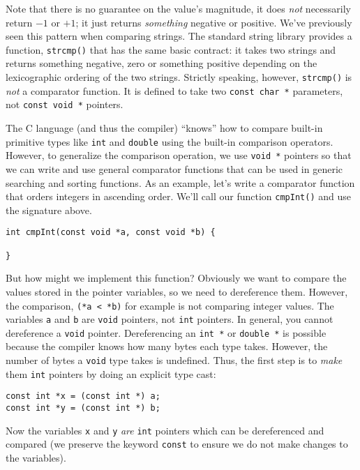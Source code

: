 Note that there is no guarantee on the value's magnitude, it does \emph{not}
necessarily return $-1$ or $+1$; it just returns \emph{something} negative or
positive.  We've previously seen this pattern when comparing strings.  The
standard string library provides a function, \texttt{strcmp()} that
has the same basic contract: it takes two strings and returns something
negative, zero or something positive depending on the lexicographic ordering
of the two strings.  Strictly speaking, however, \texttt{strcmp()} is
\emph{not} a comparator function.  It is defined to take two 
\texttt{const char *} parameters, not \texttt{const void *}
pointers.

The C language (and thus the compiler) ``knows'' how to compare built-in
primitive types like \texttt{int} and \texttt{double} using the
built-in comparison operators.  However, to generalize the comparison operation, 
we use \texttt{void *} pointers so that we can write and use general
comparator functions that can be used in generic searching and sorting 
functions.  As an example, let's write a comparator function that orders 
integers in
ascending order.  We'll call our function \texttt{cmpInt()} and use
the signature above.

\begin{verbatim}
int cmpInt(const void *a, const void *b) {

}
\end{verbatim}

But how might we implement this function?  Obviously we want to 
compare the values
stored in the pointer variables, so we need to dereference them.  However, 
the comparison, \texttt{(*a < *b)} for example is not comparing integer
values.  The variables \texttt{a} and \texttt{b} are 
\texttt{void} pointers, not \texttt{int} pointers.  
In general, you cannot dereference a \texttt{void} pointer.  
Dereferencing an \texttt{int *} or \texttt{double *}
is possible because the compiler knows how many bytes each type 
takes.  However, the number of bytes a \texttt{void} type 
takes is undefined.  Thus, the 
first step is to \emph{make} them \texttt{int} pointers by doing an
explicit type cast:

\begin{verbatim}
const int *x = (const int *) a;
const int *y = (const int *) b;
\end{verbatim}

Now the variables \texttt{x} and \texttt{y} \emph{are} 
\texttt{int} pointers which can be dereferenced and compared (we 
preserve the keyword \texttt{const} to ensure we do not make changes
to the variables).  

